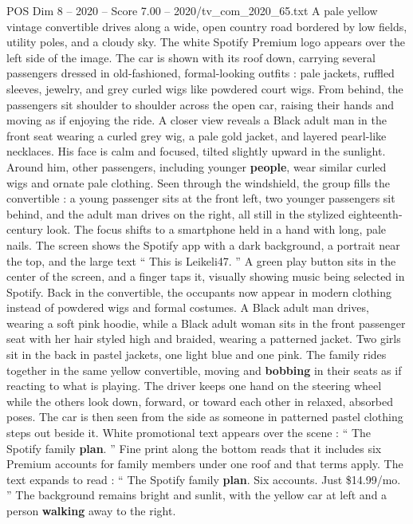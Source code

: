 \begin{textsample}{POS Dim 8 – 2020 – Score 7.00 – 2020/tv\_com\_2020\_65.txt}  \label{ex:f8_pos_055}
A pale yellow vintage convertible drives along a wide, open country road bordered by low fields, utility poles, and a cloudy sky.
The white Spotify Premium logo appears over the left side of the image.
The car is shown with its roof down, carrying several passengers dressed in old-fashioned, formal-looking outfits : pale jackets, ruffled sleeves, jewelry, and grey curled wigs like powdered court wigs.
From behind, the passengers sit shoulder to shoulder across the open car, raising their hands and moving as if enjoying the ride.
A closer view reveals a Black adult man in the front seat wearing a curled grey wig, a pale gold jacket, and layered pearl-like necklaces.
His face is calm and focused, tilted slightly upward in the sunlight.
Around him, other passengers, including younger \textbf{people}, wear similar curled wigs and ornate pale clothing.
Seen through the windshield, the group fills the convertible : a young passenger sits at the front left, two younger passengers sit behind, and the adult man drives on the right, all still in the stylized eighteenth-century look.
The focus shifts to a smartphone held in a hand with long, pale nails.
The screen shows the Spotify app with a dark background, a portrait near the top, and the large text “ This is Leikeli47. ” A green play button sits in the center of the screen, and a finger taps it, visually showing music being selected in Spotify.
Back in the convertible, the occupants now appear in modern clothing instead of powdered wigs and formal costumes.
A Black adult man drives, wearing a soft pink hoodie, while a Black adult woman sits in the front passenger seat with her hair styled high and braided, wearing a patterned jacket.
Two girls sit in the back in pastel jackets, one light blue and one pink.
The family rides together in the same yellow convertible, moving and \textbf{bobbing} in their seats as if reacting to what is playing.
The driver keeps one hand on the steering wheel while the others look down, forward, or toward each other in relaxed, absorbed poses.
The car is then seen from the side as someone in patterned pastel clothing steps out beside it.
White promotional text appears over the scene : “ The Spotify family \textbf{plan}. ” Fine print along the bottom reads that it includes six Premium accounts for family members under one roof and that terms apply.
The text expands to read : “ The Spotify family \textbf{plan}.
Six accounts.
Just \$14.99/mo. ” The background remains bright and sunlit, with the yellow car at left and a person \textbf{walking} away to the right.

\end{textsample}

